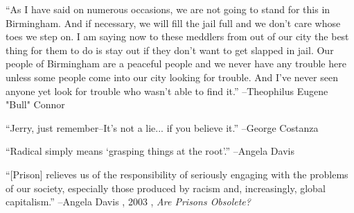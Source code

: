 \documentclass{article}%
\begin{document}
\linebreak%
\vspace{1mm}%
\begin{minipage}{\textwidth}%
\flushleft%
“As I have said on numerous occasions, we are not going to stand for this in Birmingham. And if necessary, we will fill the jail full and we don't care whose toes we step on. I am saying now to these meddlers from out of our city the best thing for them to do is stay out if they don't want to get slapped in jail. Our people of Birmingham are a peaceful people and we never have any trouble here unless some people come into our city looking for trouble. And I've never seen anyone yet look for trouble who wasn't able to find it.”%
\linebreak%
\vspace{1mm}%
–Theophilus Eugene "Bull" Connor%
\linebreak%
\vspace{1mm}%
\end{minipage}%
\linebreak%
\vspace{1mm}%
\begin{minipage}{\textwidth}%
\flushleft%
“Jerry, just remember–It's not a lie... if you believe it.”%
\linebreak%
\vspace{1mm}%
–George Costanza%
\linebreak%
\vspace{1mm}%
\end{minipage}%
\linebreak%
\vspace{1mm}%
\begin{minipage}{\textwidth}%
\flushleft%
“Radical simply means ‘grasping things at the root’.”%
\linebreak%
\vspace{1mm}%
–Angela Davis%
\linebreak%
\vspace{1mm}%
\end{minipage}%
\linebreak%
\vspace{1mm}%
\begin{minipage}{\textwidth}%
\flushleft%
“{[}Prison{]} relieves us of the responsibility of seriously engaging with the problems of  our society, especially those produced by racism and, increasingly, global capitalism.”%
\linebreak%
\vspace{1mm}%
–Angela Davis%
, 2003%
, \textit{Are Prisons Obsolete?}%
\linebreak%
\vspace{1mm}%
\end{minipage}%
\end{document}
